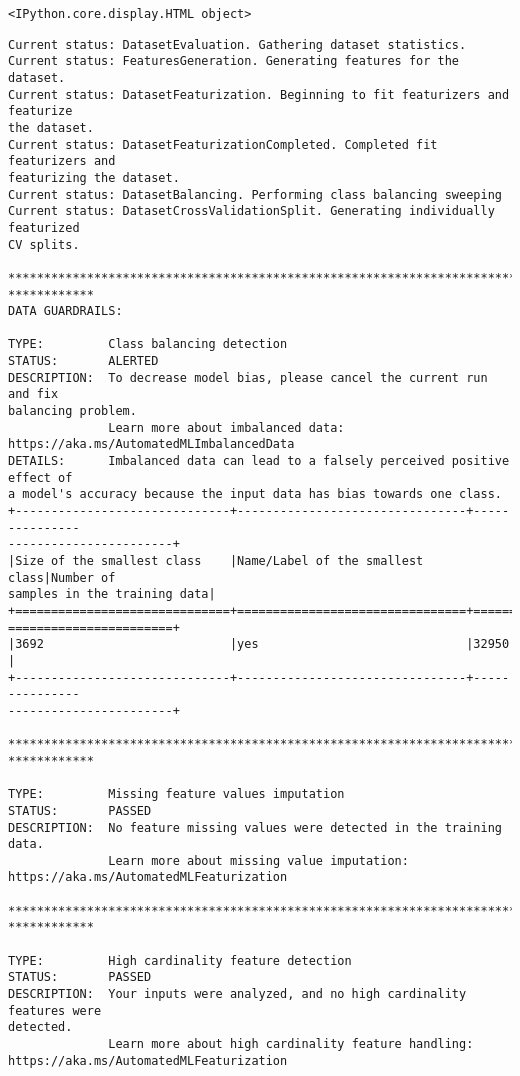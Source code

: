 \documentclass[11pt]{article}
\begin{document}
    
    \begin{Verbatim}[commandchars=\\\{\}]
<IPython.core.display.HTML object>
    \end{Verbatim}

    
    \begin{Verbatim}[commandchars=\\\{\}]
Current status: DatasetEvaluation. Gathering dataset statistics.
Current status: FeaturesGeneration. Generating features for the dataset.
Current status: DatasetFeaturization. Beginning to fit featurizers and featurize
the dataset.
Current status: DatasetFeaturizationCompleted. Completed fit featurizers and
featurizing the dataset.
Current status: DatasetBalancing. Performing class balancing sweeping
Current status: DatasetCrossValidationSplit. Generating individually featurized
CV splits.

********************************************************************************
************
DATA GUARDRAILS:

TYPE:         Class balancing detection
STATUS:       ALERTED
DESCRIPTION:  To decrease model bias, please cancel the current run and fix
balancing problem.
              Learn more about imbalanced data:
https://aka.ms/AutomatedMLImbalancedData
DETAILS:      Imbalanced data can lead to a falsely perceived positive effect of
a model's accuracy because the input data has bias towards one class.
+------------------------------+--------------------------------+---------------
-----------------------+
|Size of the smallest class    |Name/Label of the smallest class|Number of
samples in the training data|
+==============================+================================+===============
=======================+
|3692                          |yes                             |32950
|
+------------------------------+--------------------------------+---------------
-----------------------+

********************************************************************************
************

TYPE:         Missing feature values imputation
STATUS:       PASSED
DESCRIPTION:  No feature missing values were detected in the training data.
              Learn more about missing value imputation:
https://aka.ms/AutomatedMLFeaturization

********************************************************************************
************

TYPE:         High cardinality feature detection
STATUS:       PASSED
DESCRIPTION:  Your inputs were analyzed, and no high cardinality features were
detected.
              Learn more about high cardinality feature handling:
https://aka.ms/AutomatedMLFeaturization


\end{Verbatim}
\end{document}
